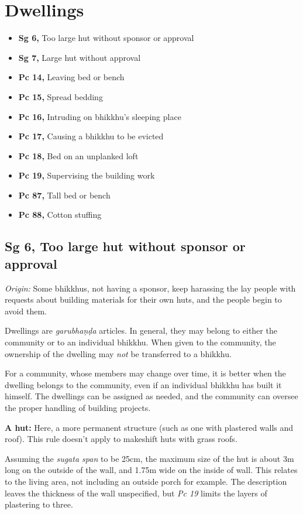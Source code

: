 \chapter{Dwellings}

\begin{itemize}
\tightlist
\item
  \textbf{Sg 6,} Too large hut without sponsor or approval
\item
  \textbf{Sg 7,} Large hut without approval
\item
  \textbf{Pc 14,} Leaving bed or bench
\item
  \textbf{Pc 15,} Spread bedding
\item
  \textbf{Pc 16,} Intruding on bhikkhu's sleeping place
\item
  \textbf{Pc 17,} Causing a bhikkhu to be evicted
\item
  \textbf{Pc 18,} Bed on an unplanked loft
\item
  \textbf{Pc 19,} Supervising the building work
\item
  \textbf{Pc 87,} Tall bed or bench
\item
  \textbf{Pc 88,} Cotton stuffing
\end{itemize}

\section{Sg 6, Too large hut without sponsor or approval}

\emph{Origin:} Some bhikkhus, not having a sponsor, keep harassing the
lay people with requests about building materials for their own huts,
and the people begin to avoid them.

Dwellings are \emph{garubhaṇḍa} articles. In general, they may belong to
either the community or to an individual bhikkhu. When given to the
community, the ownership of the dwelling may \emph{not} be transferred
to a bhikkhu.

For a community, whose members may change over time, it is better when
the dwelling belongs to the community, even if an individual bhikkhu has
built it himself. The dwellings can be assigned as needed, and the
community can oversee the proper handling of building projects.

\textbf{A hut:} Here, a more permanent structure (such as one with
plastered walls and roof). This rule doesn't apply to makeshift huts
with grass roofs.

Assuming the \emph{sugata span} to be 25cm, the maximum size of the hut
is about 3m long on the outside of the wall, and 1.75m wide on the
inside of wall. This relates to the living area, not including an
outside porch for example. The description leaves the thickness of the
wall unspecified, but \emph{Pc 19} limits the layers of plastering to
three.

